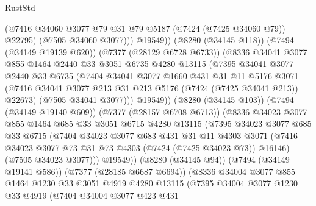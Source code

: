 \begin{lexlean}{RustStd}
\begin{coremodule}
                        (@7416 @34060 @3077 @79 @31 @79 @5187 (@7424 (@7425 @34060 @79)) @22795)
                        (@7505 @34060 @3077)))
                    @19549))
                (@8280 (@34145 @118))
                (@7494 (@34149 @19139 @620))
                (@7377 (@28129 @6728 @6733))
                (@8336
                  @34041
                  @3077
                  @855
                  @1464
                  @2440
                  @33
                  @3051
                  @6735
                  @4280
                  @13115
                  (@7395
                    @34041
                    @3077
                    @2440
                    @33
                    @6735
                    (@7404
                      @34041
                      @3077
                      @1660
                      @431
                      @31
                      @11
                      @5176
                      @3071
                      (@7416 @34041 @3077 @213 @31 @213 @5176 (@7424 (@7425 @34041 @213)) @22673)
                      (@7505 @34041 @3077)))
                  @19549))
              (@8280 (@34145 @103))
              (@7494 (@34149 @19140 @609))
              (@7377 (@28157 @6708 @6713))
              (@8336
                @34023
                @3077
                @855
                @1464
                @685
                @33
                @3051
                @6715
                @4280
                @13115
                (@7395
                  @34023
                  @3077
                  @685
                  @33
                  @6715
                  (@7404
                    @34023
                    @3077
                    @683
                    @431
                    @31
                    @11
                    @4303
                    @3071
                    (@7416 @34023 @3077 @73 @31 @73 @4303 (@7424 (@7425 @34023 @73)) @16146)
                    (@7505 @34023 @3077)))
                @19549))
            (@8280 (@34145 @94))
            (@7494 (@34149 @19141 @586))
            (@7377 (@28185 @6687 @6694))
            (@8336
              @34004
              @3077
              @855
              @1464
              @1230
              @33
              @3051
              @4919
              @4280
              @13115
              (@7395
                @34004
                @3077
                @1230
                @33
                @4919
                (@7404
                  @34004
                  @3077
                  @423
                  @431

\end{coremodule}
\end{lexlean}
